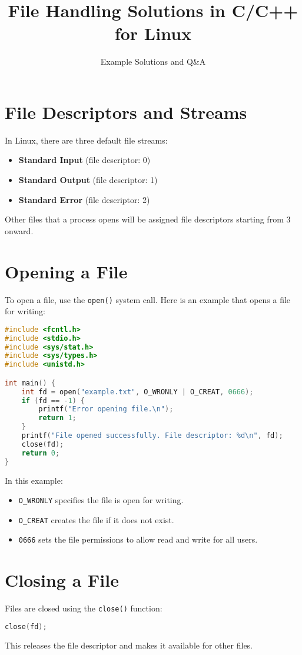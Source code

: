 \documentclass{article}
\title{File Handling Solutions in C/C++ for Linux}
\author{Example Solutions and Q\&A}
\date{}
\begin{document}
\maketitle

\section{File Descriptors and Streams}
In Linux, there are three default file streams:
\begin{itemize}
    \item \textbf{Standard Input} (file descriptor: 0)
    \item \textbf{Standard Output} (file descriptor: 1)
    \item \textbf{Standard Error} (file descriptor: 2)
\end{itemize}

Other files that a process opens will be assigned file descriptors starting from 3 onward.

\section{Opening a File}
To open a file, use the \texttt{open()} system call. Here is an example that opens a file for writing:
\begin{lstlisting}[language=C]
#include <fcntl.h>
#include <stdio.h>
#include <sys/stat.h>
#include <sys/types.h>
#include <unistd.h>

int main() {
    int fd = open("example.txt", O_WRONLY | O_CREAT, 0666);
    if (fd == -1) {
        printf("Error opening file.\n");
        return 1;
    }
    printf("File opened successfully. File descriptor: %d\n", fd);
    close(fd);
    return 0;
}
\end{lstlisting}
In this example:
\begin{itemize}
    \item \texttt{O\_WRONLY} specifies the file is open for writing.
    \item \texttt{O\_CREAT} creates the file if it does not exist.
    \item \texttt{0666} sets the file permissions to allow read and write for all users.
\end{itemize}

\section{Closing a File}
Files are closed using the \texttt{close()} function:
\begin{lstlisting}[language=C]
close(fd);
\end{lstlisting}
This releases the file descriptor and makes it available for other files.
\end{document}
